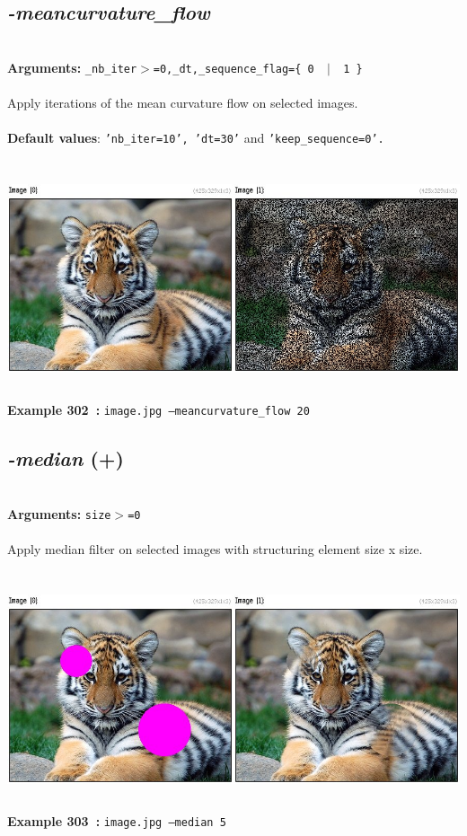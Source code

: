 \documentclass[a4paper,11pt,twoside]{book}
\begin{document}
\subsection{\emph{-meancurvature\_flow} }\vspace*{-0.5em}
~\\\textbf{Arguments: } 
{\small \texttt{\_nb\_iter$>$=0,\_dt,\_sequence\_flag=\{ 0 ~$|$~ 1 \}}}\\~\\
Apply iterations of the mean curvature flow on selected images.
~\\~\\\textbf{Default values}: {\small \texttt{'nb\_iter=10', 'dt=30'} and \texttt{'keep\_sequence=0'.}}
\begin{center}\includegraphics[keepaspectratio=true,height=7cm,width=\textwidth]{img/gmic_def302.jpg}\\
{\footnotesize \textbf{Example 302~:} \texttt{image.jpg --meancurvature\_flow 20}}
\end{center}

\subsection{\emph{-median} (+)}\vspace*{-0.5em}
~\\\textbf{Arguments: } 
{\small \texttt{size$>$=0}}\\~\\
Apply median filter on selected images with structuring element size x size.
\begin{center}\includegraphics[keepaspectratio=true,height=7cm,width=\textwidth]{img/gmic_def303.jpg}\\
{\footnotesize \textbf{Example 303~:} \texttt{image.jpg --median 5}}
\end{center}
\end{document}
